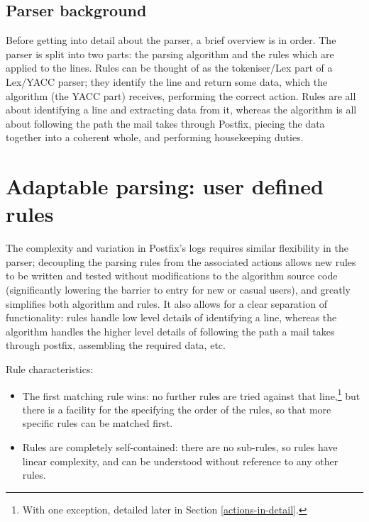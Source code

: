 \documentclass[a4paper,12pt,draft]{article}
\begin{document}
\subsection{Parser background}

Before getting into detail about the parser, a brief overview is in order.
The parser is split into two parts: the parsing algorithm and the rules
which are applied to the lines.  Rules can be thought of as the
tokeniser/Lex part of a Lex/YACC parser; they identify the line and return
some data, which the algorithm (the YACC part) receives, performing the
correct action.  Rules are all about identifying a line and extracting data
from it, whereas the algorithm is all about following the path the mail
takes through Postfix, piecing the data together into a coherent whole, and
performing housekeeping duties.


\section{Adaptable parsing: user defined rules}

The complexity and variation in Postfix's logs requires similar flexibility
in the parser; decoupling the parsing rules from the associated actions
allows new rules to be written and tested without modifications to the
algorithm source code (significantly lowering the barrier to entry for new
or casual users), and greatly simplifies both algorithm and rules.  It also
allows for a clear separation of functionality: rules handle low level
details of identifying a line, whereas the algorithm handles the higher
level details of following the path a mail takes through postfix,
assembling the required data, etc.

Rule characteristics:

\begin{itemize}

    \item The first matching rule wins: no further rules are tried against
        that line,\footnote{With one exception, detailed later in Section
        \ref{actions-in-detail}.} but there is a facility for the specifying
        the order of the rules, so that more specific rules can be matched
        first.
        
    \item Rules are completely self-contained: there are no sub-rules, so
        rules have linear complexity, and can be understood without
        reference to any other rules.
        
\end{itemize}
\end{document}
